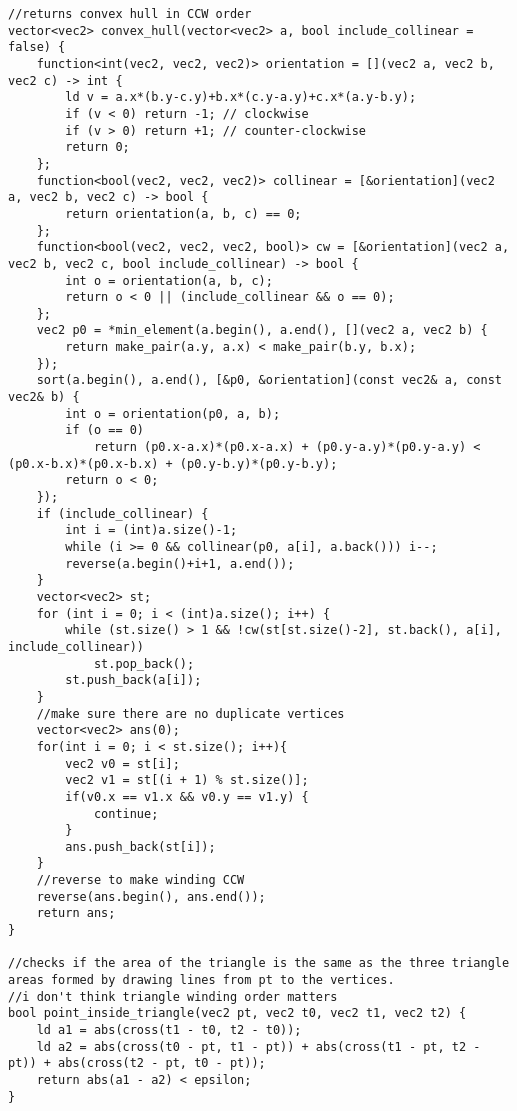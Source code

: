 \documentclass[8pt, headheight=10pt, a4paper]{article}
\begin{document}
\begin{multicols*}{3}
\begin{lstlisting}
//returns convex hull in CCW order
vector<vec2> convex_hull(vector<vec2> a, bool include_collinear = false) {
    function<int(vec2, vec2, vec2)> orientation = [](vec2 a, vec2 b, vec2 c) -> int {
        ld v = a.x*(b.y-c.y)+b.x*(c.y-a.y)+c.x*(a.y-b.y);
        if (v < 0) return -1; // clockwise
        if (v > 0) return +1; // counter-clockwise
        return 0;
    };
    function<bool(vec2, vec2, vec2)> collinear = [&orientation](vec2 a, vec2 b, vec2 c) -> bool {
        return orientation(a, b, c) == 0;
    };
    function<bool(vec2, vec2, vec2, bool)> cw = [&orientation](vec2 a, vec2 b, vec2 c, bool include_collinear) -> bool {
        int o = orientation(a, b, c);
        return o < 0 || (include_collinear && o == 0);
    };
    vec2 p0 = *min_element(a.begin(), a.end(), [](vec2 a, vec2 b) {
        return make_pair(a.y, a.x) < make_pair(b.y, b.x);
    });
    sort(a.begin(), a.end(), [&p0, &orientation](const vec2& a, const vec2& b) {
        int o = orientation(p0, a, b);
        if (o == 0)
            return (p0.x-a.x)*(p0.x-a.x) + (p0.y-a.y)*(p0.y-a.y) < (p0.x-b.x)*(p0.x-b.x) + (p0.y-b.y)*(p0.y-b.y);
        return o < 0;
    });
    if (include_collinear) {
        int i = (int)a.size()-1;
        while (i >= 0 && collinear(p0, a[i], a.back())) i--;
        reverse(a.begin()+i+1, a.end());
    }
    vector<vec2> st;
    for (int i = 0; i < (int)a.size(); i++) {
        while (st.size() > 1 && !cw(st[st.size()-2], st.back(), a[i], include_collinear))
            st.pop_back();
        st.push_back(a[i]);
    }
    //make sure there are no duplicate vertices
    vector<vec2> ans(0);
    for(int i = 0; i < st.size(); i++){
        vec2 v0 = st[i];
        vec2 v1 = st[(i + 1) % st.size()];
        if(v0.x == v1.x && v0.y == v1.y) {
            continue;
        }
        ans.push_back(st[i]);
    }
    //reverse to make winding CCW
    reverse(ans.begin(), ans.end());
    return ans;
}

//checks if the area of the triangle is the same as the three triangle areas formed by drawing lines from pt to the vertices. 
//i don't think triangle winding order matters
bool point_inside_triangle(vec2 pt, vec2 t0, vec2 t1, vec2 t2) {
    ld a1 = abs(cross(t1 - t0, t2 - t0));
    ld a2 = abs(cross(t0 - pt, t1 - pt)) + abs(cross(t1 - pt, t2 - pt)) + abs(cross(t2 - pt, t0 - pt));
    return abs(a1 - a2) < epsilon;
}


\end{lstlisting}
\end{multicols*}
\end{document}
